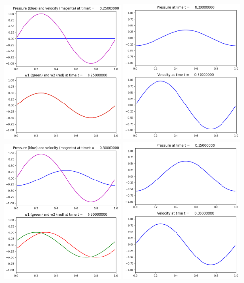 \documentclass[11pt]{article}
\begin{document}
\includegraphics[width=0.475\textwidth]{frame0005fig2.png}
\vskip 10pt 
\includegraphics[width=0.475\textwidth]{frame0006fig1.png}
\includegraphics[width=0.475\textwidth]{frame0006fig2.png}
\vskip 10pt 
\includegraphics[width=0.475\textwidth]{frame0007fig1.png}
\end{document}
